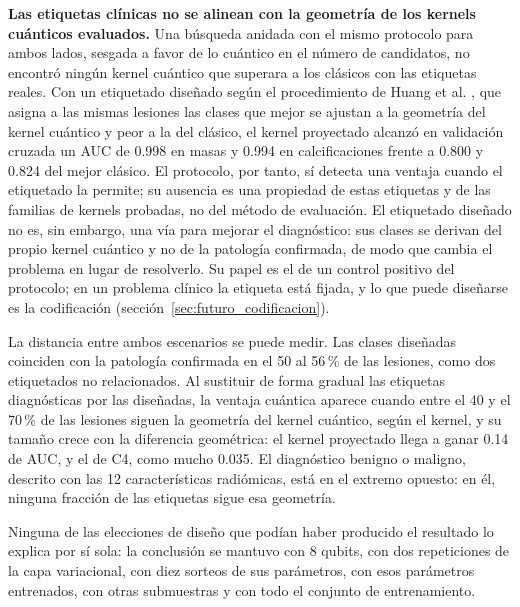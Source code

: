 \textbf{Las etiquetas clínicas no se alinean con la geometría de los kernels cuánticos evaluados.} Una
búsqueda anidada con el mismo protocolo para ambos lados, sesgada a favor de lo cuántico en el número de
candidatos, no encontró ningún kernel cuántico que superara a los clásicos con las etiquetas reales.
Con un etiquetado diseñado según el procedimiento de Huang et al. \cite{huang2021power}, que asigna a las
mismas lesiones las clases que mejor se ajustan a la geometría del kernel cuántico y peor a la del clásico,
el kernel proyectado alcanzó en validación cruzada un AUC de 0.998 en masas y 0.994 en calcificaciones frente a
0.800 y 0.824 del mejor clásico. El protocolo, por tanto, sí detecta una ventaja cuando el etiquetado la
permite; su ausencia es una propiedad de estas etiquetas y de las familias de kernels probadas, no del
método de evaluación. El etiquetado diseñado no es, sin embargo, una vía para mejorar el diagnóstico: sus
clases se derivan del propio kernel cuántico y no de la patología confirmada, de modo que cambia el problema
en lugar de resolverlo. Su papel es el de un control positivo del protocolo; en un problema clínico la etiqueta
está fijada, y lo que puede diseñarse es la codificación (sección~\ref{sec:futuro_codificacion}).

La distancia entre ambos escenarios se puede medir. Las clases diseñadas coinciden con la patología
confirmada en el 50 al 56\,\% de las lesiones, como dos etiquetados no relacionados. Al sustituir de forma
gradual las etiquetas diagnósticas por las diseñadas, la ventaja cuántica aparece cuando entre el 40 y el
70\,\% de las lesiones siguen la geometría del kernel cuántico, según el kernel, y su tamaño crece con la
diferencia geométrica: el kernel proyectado llega a ganar 0.14 de AUC, y el de C4, como mucho 0.035. El
diagnóstico benigno o maligno, descrito con las 12 características radiómicas, está en el extremo
opuesto: en él, ninguna fracción de las etiquetas sigue esa geometría.

Ninguna de las elecciones de diseño que podían haber producido el resultado lo explica por sí sola: la
conclusión se mantuvo con 8 qubits, con dos repeticiones de la capa variacional, con diez sorteos de sus
parámetros, con esos parámetros entrenados, con otras submuestras y con todo el conjunto de entrenamiento.

